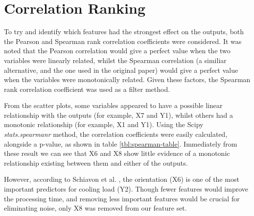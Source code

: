 \documentclass[12pt]{article}
\begin{document}
\section{Correlation Ranking}

To try and identify which features had the strongest effect on the outputs, both the Pearson and Spearman rank correlation coefficients were considered. It was noted that the Pearson correlation would give a perfect value when the two variables were linearly related, whilst the Spearman correlation (a similiar alternative, and the one used in the original paper) would give a perfect value when the variables were monotonically related. Given these factors, the Spearman rank correlation coefficient was used as a filter method.

From the scatter plots, some variables appeared to have a possible linear relationship with the outputs (for example, X7 and Y1), whilst others had a monotonic relationship (for example, X1 and Y1). Using the Scipy \emph{stats.spearmanr} method, the correlation coefficients were easily calculated, alongside a p-value, as shown in table \ref{tbl:spearman-table}. Immediately from these result we can see that X6 and X8 show little evidence of a monotonic relationship existing between them and either of the outputs. 

However, according to Schiavon et al. \cite{schiavon_lee_bauman_webster_2010}, the orientation (X6) is one of the most important predictors for cooling load (Y2). Though fewer features would improve the processing time, and removing less important features would be crucial for  eliminating noise, only X8 was removed from our feature set.
\end{document}
